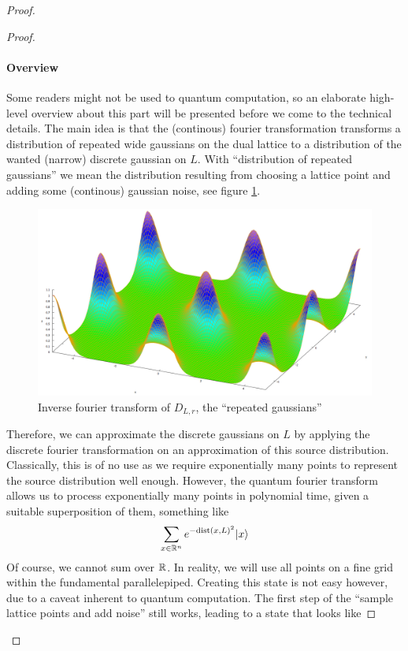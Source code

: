 \begin{proof}
\begin{proof}
\paragraph{Overview} Some readers might not be used to quantum computation, so an elaborate high-level overview about this part will be presented before we come to the technical details.
The main idea is that the (continous) fourier transformation transforms a distribution of repeated wide gaussians on the dual lattice to a distribution of the wanted (narrow) discrete gaussian on $L$. With ``distribution of repeated gaussians'' we mean the distribution resulting from choosing a lattice point and adding some (continous) gaussian noise, see figure \ref{repeated_gaussians}.
\begin{figure}[ht]
\centering
\includegraphics[width=\textwidth]{repeated_gaussians.png}
\caption{Inverse fourier transform of $D_{L, r}$, the ``repeated gaussians''}
\label{repeated_gaussians}
\end{figure}
Therefore, we can approximate the discrete gaussians on $L$ by applying the discrete fourier transformation on an approximation of this source distribution. Classically, this is of no use as we require exponentially many points to represent the source distribution well enough. However, the quantum fourier transform allows us to process exponentially many points in polynomial time, given a suitable superposition of them, something like
\begin{equation}
\sum_{x \in \mathbb{R}^n} e^{-\mathrm{dist}(x, L)^2} |x\rangle \nonumber
\end{equation}
Of course, we cannot sum over $\mathbb{R}$. In reality, we will use all points on a fine grid within the fundamental parallelepiped. Creating this state is not easy however, due to a caveat inherent to quantum computation. The first step of the ``sample lattice points and add noise'' still works, leading to a state that looks like

\end{proof}
\end{proof}

